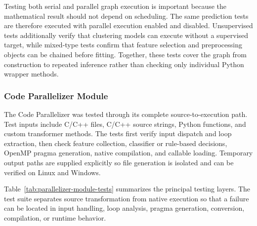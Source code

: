 \documentclass[12pt,a4paper]{report}
\begin{document}
\noindent Testing both serial and parallel graph execution is important because
the mathematical result should not depend on scheduling. The same prediction
tests are therefore executed with parallel execution enabled and disabled.
Unsupervised tests additionally verify that clustering models can execute
without a supervised target, while mixed-type tests confirm that feature
selection and preprocessing objects can be chained before fitting. Together,
these tests cover the graph from construction to repeated inference rather than
checking only individual Python wrapper methods.

\subsubsection{Code Parallelizer Module}

The Code Parallelizer was tested through its complete source-to-execution
path. Test inputs include C/C++ files, C/C++ source strings, Python functions,
and custom transformer methods. The tests first verify input dispatch and loop
extraction, then check feature collection, classifier or rule-based decisions,
OpenMP pragma generation, native compilation, and callable loading. Temporary
output paths are supplied explicitly so file generation is isolated and can be
verified on Linux and Windows.

Table~\ref{tab:parallelizer-module-tests} summarizes the principal testing
layers. The test suite separates source transformation from native execution so
that a failure can be located in input handling, loop analysis, pragma
generation, conversion, compilation, or runtime behavior.
\end{document}
